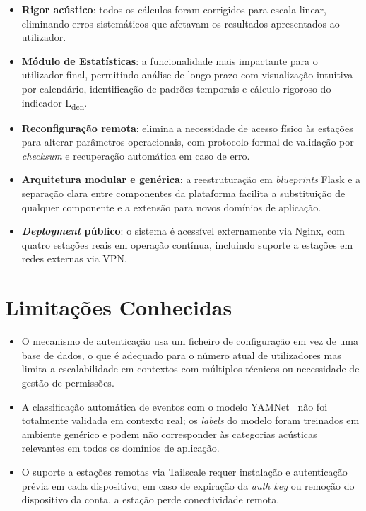 \documentclass[12pt,a4paper]{report}
\begin{document}
\begin{itemize}
  \item \textbf{Rigor acústico}: todos os cálculos foram corrigidos para escala linear, eliminando erros sistemáticos que afetavam os resultados apresentados ao utilizador.

  \item \textbf{Módulo de Estatísticas}: a funcionalidade mais impactante para o utilizador final, permitindo análise de longo prazo com visualização intuitiva por calendário, identificação de padrões temporais e cálculo rigoroso do indicador L\textsubscript{den}.

  \item \textbf{Reconfiguração remota}: elimina a necessidade de acesso físico às estações para alterar parâmetros operacionais, com protocolo formal de validação por \textit{checksum} e recuperação automática em caso de erro.

  \item \textbf{Arquitetura modular e genérica}: a reestruturação em \textit{blueprints} Flask e a separação clara entre componentes da plataforma facilita a substituição de qualquer componente e a extensão para novos domínios de aplicação.

  \item \textbf{\textit{Deployment} público}: o sistema é acessível externamente via Nginx, com quatro estações reais em operação contínua, incluindo suporte a estações em redes externas via VPN.
\end{itemize}

\section{Limitações Conhecidas}

\begin{itemize}
  \item O mecanismo de autenticação usa um ficheiro de configuração em vez de uma base de dados, o que é adequado para o número atual de utilizadores mas limita a escalabilidade em contextos com múltiplos técnicos ou necessidade de gestão de permissões.
  \item A classificação automática de eventos com o modelo YAMNet~\cite{yamnet} não foi totalmente validada em contexto real; os \textit{labels} do modelo foram treinados em ambiente genérico e podem não corresponder às categorias acústicas relevantes em todos os domínios de aplicação.
  \item O suporte a estações remotas via Tailscale requer instalação e autenticação prévia em cada dispositivo; em caso de expiração da \textit{auth key} ou remoção do dispositivo da conta, a estação perde conectividade remota.
\end{itemize}
\end{document}
